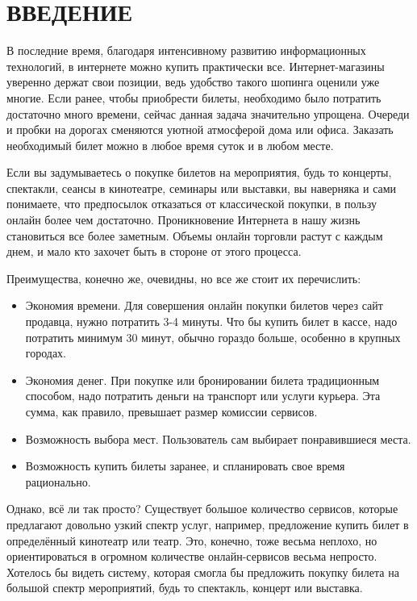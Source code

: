 \section*{ВВЕДЕНИЕ}

В последние время, благодаря интенсивному развитию информационных технологий, в интернете можно купить практически все. Интернет-магазины уверенно держат свои позиции, ведь удобство такого шопинга оценили уже многие. Если ранее, чтобы приобрести билеты, необходимо было потратить достаточно много времени, сейчас данная задача значительно упрощена. Очереди и пробки на дорогах сменяются уютной атмосферой дома или офиса. Заказать необходимый билет можно в любое время суток и в любом месте.

Если вы задумываетесь о покупке билетов на мероприятия, будь то концерты, спектакли, сеансы в кинотеатре, семинары или выставки, вы наверняка и сами понимаете, что предпосылок отказаться от классической покупки, в пользу онлайн более чем достаточно. Проникновение Интернета в нашу жизнь становиться все более заметным. Объемы онлайн торговли растут с каждым днем, и мало кто захочет быть в стороне от этого процесса.

Преимущества, конечно же, очевидны, но все же стоит их перечислить:
\begin{itemize}
  \item Экономия времени. Для совершения онлайн покупки билетов через сайт продавца, нужно потратить 3-4 минуты. Что бы купить билет в кассе, надо потратить минимум 30 минут, обычно гораздо больше, особенно в крупных городах.
  \item Экономия денег. При покупке или бронировании билета традиционным способом, надо потратить деньги на транспорт или услуги курьера. Эта сумма, как правило, превышает размер комиссии сервисов.
  \item Возможность выбора мест. Пользователь сам выбирает понравившиеся места. 
  \item Возможность купить билеты заранее, и спланировать свое время рационально. 
\end{itemize}

Однако, всё ли так просто? Существует большое количество сервисов, которые предлагают довольно узкий спектр услуг, например, предложение купить билет в определённый кинотеатр или театр. Это, конечно, тоже весьма неплохо, но ориентироваться в огромном количестве онлайн-сервисов весьма непросто. Хотелось бы видеть систему, которая смогла бы предложить покупку билета на большой спектр мероприятий, будь то спектакль, концерт или выставка.


